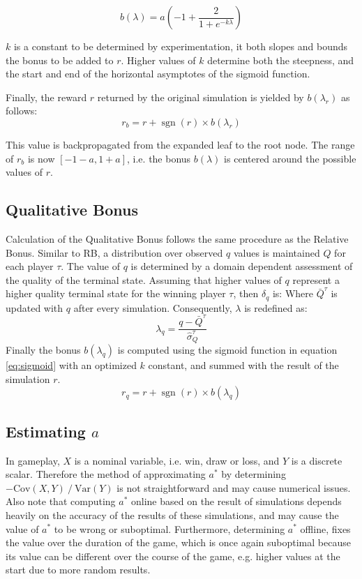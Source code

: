 \documentclass{ecai2014}
\newcommand{\sgn}{\mathop{\mathrm{sgn}}}
\newcommand{\Var}[1]{\mathrm{Var}\left( #1 \right)}
\newcommand{\Cov}[1]{\mathrm{Cov}\left( #1 \right)}
\begin{document}
\begin{equation}
b(\lambda)=a\left(-1+\frac{2}{1+e^{-k\lambda}}\right)
\label{eq:sigmoid}
\end{equation}

$k$ is a constant to be determined by experimentation, it both slopes and bounds the bonus to be added to $r$. Higher values of $k$ determine both the steepness, and the start and end of the horizontal asymptotes of the sigmoid function.

Finally, the reward $r$ returned by the original simulation is yielded by $b(\lambda_r)$ as follows:
\begin{equation}
r_b=r+\sgn(r)\times b(\lambda_r)
\end{equation}

This value is backpropagated from the expanded leaf to the root node. The range of $r_b$ is now $[-1-a, 1+a]$, i.e. the bonus $b(\lambda)$ is centered around the possible values of $r$.

\subsection{Qualitative Bonus}
\label{subsec:qb}
Calculation of the Qualitative Bonus follows the same procedure as the Relative Bonus. Similar to RB, a distribution over observed $q$ values is maintained $Q$ for each player $\tau$. The value of $q$ is determined by a domain dependent assessment of the quality of the terminal state. Assuming that higher values of $q$ represent a higher quality terminal state for the winning player $\tau$, then $\delta_q$ is:
Where $\bar{Q}^\tau$ is updated with $q$ after every simulation. Consequently, $\lambda$ is redefined as:
\begin{equation}
\lambda_q = \frac{q - \bar{Q}^\tau}{\hat{\sigma}^\tau_Q}
\end{equation}
Finally the bonus $b(\lambda_q)$ is computed using the sigmoid function in equation \ref{eq:sigmoid} with an optimized $k$ constant, and summed with the result of the simulation $r$.
\begin{equation}
r_q=r+\sgn(r)\times b(\lambda_q)
\end{equation}

\subsection{Estimating $a$}
\label{subsec:astar}

In gameplay, $X$ is a nominal variable, i.e. win, draw or loss, and $Y$ is a discrete scalar. Therefore the method of approximating $a^*$ by determining $-\Cov{X,Y}\mathbin{/}\Var{Y}$ is not straightforward and may cause numerical issues. Also note that computing $a^*$ online based on the result of simulations depends heavily on the accuracy of the results of these simulations, and may cause the value of $a^*$ to be wrong or suboptimal. Furthermore, determining $a^*$ offline, fixes the value over the duration of the game, which is once again suboptimal because its value can be different over the course of the game, e.g. higher values at the start due to more random results.
\end{document}
